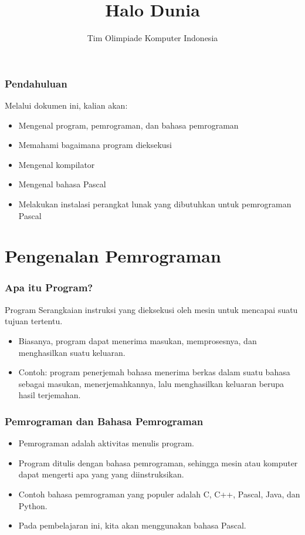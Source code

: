 

\title{Halo Dunia}
\author{Tim Olimpiade Komputer Indonesia}
\date{}



\begin{frame}
\titlepage
\end{frame}

\begin{frame}
\frametitle{Pendahuluan}
Melalui dokumen ini, kalian akan:
\begin{itemize}
  \item Mengenal program, pemrograman, dan bahasa pemrograman
  \item Memahami bagaimana program dieksekusi
  \item Mengenal kompilator
  \item Mengenal bahasa Pascal
  \item Melakukan instalasi perangkat lunak yang dibutuhkan untuk pemrograman Pascal
\end{itemize}
\end{frame}

\section{Pengenalan Pemrograman}
\frame{\sectionpage}

\begin{frame}
\frametitle{Apa itu Program?}
\begin{block}{Program}
  Serangkaian instruksi yang dieksekusi oleh mesin untuk mencapai suatu tujuan tertentu.
\end{block}
\begin{itemize}
  \item Biasanya, program dapat menerima masukan, memprosesnya, dan menghasilkan suatu keluaran.
  \item Contoh: program penerjemah bahasa menerima berkas dalam suatu bahasa sebagai masukan, menerjemahkannya, lalu menghasilkan keluaran berupa hasil terjemahan.
\end{itemize}
\end{frame}

\begin{frame}
\frametitle{Pemrograman dan Bahasa Pemrograman}
\begin{itemize}
  \item Pemrograman adalah aktivitas menulis program.
  \item Program ditulis dengan bahasa pemrograman, sehingga mesin atau komputer dapat mengerti apa yang yang diinstruksikan.
  \item Contoh bahasa pemrograman yang populer adalah C, C++, Pascal, Java, dan Python.
  \item Pada pembelajaran ini, kita akan menggunakan bahasa Pascal.
\end{itemize}
\end{frame}

